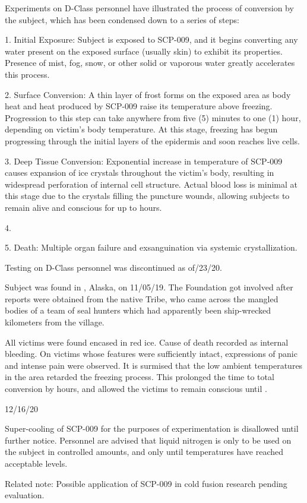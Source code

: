 Experiments on D-Class personnel have illustrated the process of conversion by the subject, which has been condensed down to a series of steps:

1. Initial Exposure: Subject is exposed to SCP-009, and it begins converting any water present on the exposed surface (usually skin) to exhibit its properties. Presence of mist, fog, snow, or other solid or vaporous water greatly accelerates this process.

2. Surface Conversion: A thin layer of frost forms on the exposed area as body heat and heat produced by SCP-009 raise its temperature above freezing. Progression to this step can take anywhere from five (5) minutes to one (1) hour, depending on victim's body temperature. At this stage, freezing has begun progressing through the initial layers of the epidermis and soon reaches live cells.

3. Deep Tissue Conversion: Exponential increase in temperature of SCP-009 causes expansion of ice crystals throughout the victim's body, resulting in widespread perforation of internal cell structure. Actual blood loss is minimal at this stage due to the crystals filling the puncture wounds, allowing subjects to remain alive and conscious for up to  hours.

4. \expunged

5. Death: Multiple organ failure and exsanguination via systemic crystallization.

Testing on D-Class personnel was discontinued as of/23/20.

 Subject was found in , Alaska, on 11/05/19. The Foundation got involved after reports were obtained from the native  Tribe, who came across the mangled bodies of a team of seal hunters which had apparently been ship-wrecked  kilometers from the village.

All victims were found encased in red ice. Cause of death recorded as internal bleeding. On victims whose features were sufficiently intact, expressions of panic and intense pain were observed. It is surmised that the low ambient temperatures in the area retarded the freezing process. This prolonged the time to total conversion by  hours, and allowed the victims to remain conscious until \expunged.

 12/16/20

Super-cooling of SCP-009 for the purposes of experimentation is disallowed until further notice. Personnel are advised that liquid nitrogen is only to be used on the subject in controlled amounts, and only until temperatures have reached acceptable levels.

Related note: Possible application of SCP-009 in cold fusion research pending evaluation.